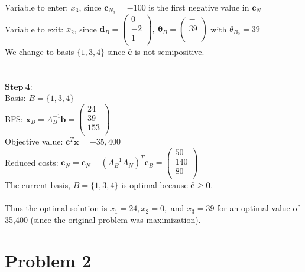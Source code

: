 \documentclass{article}
\begin{document}
Variable to enter: $x_3$, since $\mathbf{\bar{c}}_{N_3} = -100$ is the first negative value in $\mathbf{\bar{c}}_N$\\
Variable to exit: $x_2$, since $\mathbf{d}_B = \left(
    \begin{array}{c}
        0\\
        -2\\
        1\\
    \end{array}
\right),~
\mathbf{\theta}_B = \left(
    \begin{array}{c}
        -\\
        39\\
        -\\
    \end{array}
\right)$ with $\theta_{B_2} = 39$\\
We change to basis $\{1,3,4\}$ since $\mathbf{\bar{c}}$ is not semipositive.\\
\\
\\
$\mathbf{Step~4}$:\\
Basis: $B = \{1, 3, 4\}$\\
BFS: $\mathbf{x}_B = A_B^{-1}\mathbf{b} = 
\left(
    \begin{array}{c}
        24\\
        39\\
        153\\
    \end{array}
\right)$\\
Objective value: $\mathbf{c}^T \mathbf{x} = -35,400$\\
Reduced costs: $\mathbf{\bar{c}}_N = \mathbf{c}_N - (A_B^{-1} A_N)^T \mathbf{c}_B = 
\left(
    \begin{array}{c}
        50\\
        140\\
        80\\
    \end{array}
\right)$\\
The current basis, $B = \{1, 3, 4\}$ is optimal because $\mathbf{\bar{c}} \ge \mathbf{0}$. \\
\\
Thus the optimal solution is $x_1 = 24, x_2 = 0,$ and $x_3 = 39$ for an optimal value of 35,400 (since the original problem was maximization).

\section{Problem 2}
\end{document}
